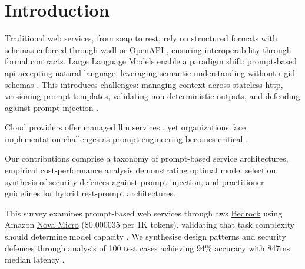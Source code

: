 \section{Introduction}

Traditional web services, from \gls{soap} to \gls{rest}, rely on structured formats with schemas enforced through \gls{wsdl} or OpenAPI \cite{fielding_architectural_2000, andrews_openai_2025}, ensuring interoperability through formal contracts. Large Language Models enable a paradigm shift: prompt-based \gls{api} accepting natural language, leveraging semantic understanding without rigid schemas \cite{brown_language_2020, vaswani_attention_2017}. This introduces challenges: managing context across stateless \gls{http}, versioning prompt templates, validating non-deterministic outputs, and defending against prompt injection \cite{owasp_top_2024, lercher_managing_2024}.

Cloud providers offer managed \gls{llm} services \cite{aws_bedrock_2025}, yet organizations face implementation challenges as prompt engineering becomes critical \cite{sahoo_systematic_2025, white_prompt_2023}.

Our contributions comprise a taxonomy of prompt-based service architectures, empirical cost-performance analysis demonstrating optimal model selection, synthesis of security defences against prompt injection, and practitioner guidelines for hybrid \gls{rest}-prompt architectures.

This survey examines prompt-based web services through \gls{aws} \href{https://aws.amazon.com/bedrock/}{Bedrock} using Amazon \href{https://docs.aws.amazon.com/bedrock/latest/userguide/model-card-amazon-nova-micro.html}{Nova Micro} (\$0.000035 per 1K tokens), validating that task complexity should determine model capacity \cite{aws_nova_2025}. We synthesise design patterns and security defences through analysis of 100 test cases achieving 94\% accuracy with 847ms median latency \cite{aws_bedrock_2025, chen_prompt_2025}.
